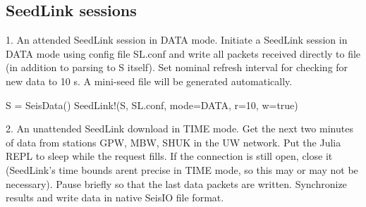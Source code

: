 \documentclass[letterpaper,11pt,english]{sphinxmanual}
\begin{document}
\begin{sphinxVerbatim}[commandchars=\\\{\}]
  
  
      
      
\end{sphinxVerbatim}


\subsection{SeedLink sessions}
\label{\detokenize{src/Appendices/examples:seedlink-sessions}}
1. An attended SeedLink session in DATA mode. Initiate a SeedLink session in DATA mode using config file SL.conf and write all packets received directly to file (in addition to parsing to S itself). Set nominal refresh interval for checking for new data to 10 s. A mini-seed file will be generated automatically.

\begin{sphinxVerbatim}[commandchars=\\\{\}]
S = SeisData()
SeedLink!(S, \PYGZdq{}SL.conf\PYGZdq{}, mode=\PYGZdq{}DATA\PYGZdq{}, r=10, w=true)
\end{sphinxVerbatim}

2. An unattended SeedLink download in TIME mode. Get the next two minutes of data from stations GPW, MBW, SHUK in the UW network. Put the Julia REPL to sleep while the request fills. If the connection is still open, close it (SeedLink’s time bounds arent precise in TIME mode, so this may or may not be necessary). Pause briefly so that the last data packets are written. Synchronize results and write data in native SeisIO file format.
\end{document}
